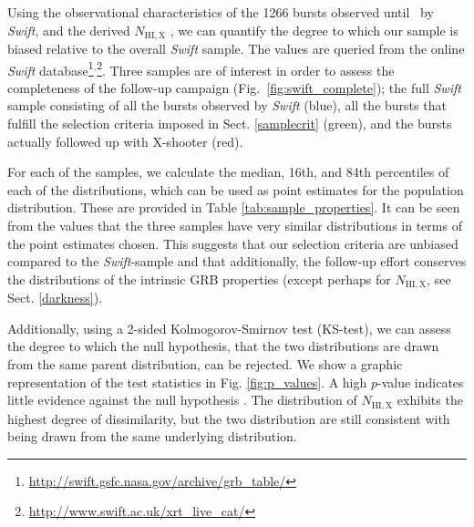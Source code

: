 \documentclass[longauth]{aa}    %
\begin{document}
Using the observational characteristics of the 1266 bursts observed until
\termdate~by \textit{Swift}, and the derived $N_{\mathrm{HI,X}}$
\citep{Evans2009}, we can quantify the degree to which our sample is biased
relative to the overall \textit{Swift} sample. The values are queried from the
online \textit{Swift}
database\footnote{\url{http://swift.gsfc.nasa.gov/archive/grb\_table/}}$^,$\footnote{\url{http://www.swift.ac.uk/xrt\_live\_cat/}}. Three samples are of interest in order to assess the completeness of the follow-up campaign (Fig.~\ref{fig:swift_complete}); the full \textit{Swift} sample consisting of all the bursts observed by \textit{Swift} (blue), all the bursts that fulfill the selection criteria imposed in Sect. \ref{samplecrit} (green), and the bursts actually followed up with X-shooter (red).



For each of the samples, we calculate the median, 16th, and 84th percentiles of
each of the distributions, which can be used as point estimates for the
population distribution. These are provided in Table
\ref{tab:sample_properties}. It can be seen from the values that the three
samples have very similar distributions in terms of the point estimates chosen.
This suggests that our selection criteria are unbiased compared to the
\textit{Swift}-sample and that additionally, the follow-up effort conserves the
distributions of the intrinsic GRB properties (except perhaps for
$N_{\mathrm{HI,X}}$, see Sect. \ref{darkness}).

Additionally, using a 2-sided Kolmogorov-Smirnov test (KS-test), we can assess
the degree to which the null hypothesis, that the two distributions are drawn
from the same parent distribution, can be rejected. We show a graphic
representation of the test statistics in Fig. \ref{fig:p_values}. A high $p$-value
indicates little evidence against the null hypothesis . The distribution of
$N_{\mathrm{HI,X}}$ exhibits the highest degree of dissimilarity, but the two
distribution are still consistent with being drawn from the same underlying
distribution.
\end{document}
